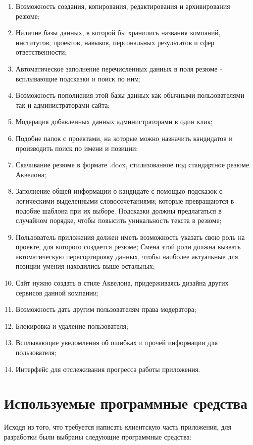 \documentclass[a4paper,12pt]{diplom}
\begin{document}
\begin{enumerate}
  \item Возможность создания, копирования, редактирования и архивирования резюме;
	\item Наличие базы данных, в которой бы хранились названия компаний, институтов,
	проектов, навыков, персональных результатов и сфер ответственности;
	\item Автоматическое заполнение перечисленных данных в поля резюме - всплывающие подсказки и поиск по ним;
	\item Возможность пополнения этой базы данных как обычными пользователями так и администраторами сайта;
	\item Модерация добавленных данных администраторами в один клик;
	\item Подобие папок с проектами, на которые можно назначить кандидатов и производить поиск по имени и позиции;
	\item Скачивание резюме в формате .docx, стилизованное под стандартное резюме Аквелона;
	\item Заполнение общей информации о кандидате с помощью подсказок с логическими выделенными словосочетаниями;
	 которые превращаются в подобие шаблона при их выборе. Подсказки должны предлагаться в случайном порядке, чтобы повысить уникальность текста в резюме;
	\item Пользователь приложения должен иметь возможность указать свою роль на проекте, для которого создается резюме;
	 Смена этой роли должна вызвать автоматическую пересортировку данных, 
	 чтобы наиболее актуальные для позиции умения находились выше остальных;
	 \item Сайт нужно создать в стиле Аквелона, придерживаясь дизайна других сервисов данной 
	 компании;
	 \item Возможность дать другим пользователям права модератора;
	 \item Блокировка и удаление пользователя;
	 \item Всплывающие уведомления об ошибках и прочей информации для пользователя;
	 \item Интерфейс для отслеживания прогресса работы приложения.
\end{enumerate}

\section{Используемые программные средства}

Исходя из того, что требуется написать клиентскую часть приложения, для разработки были выбраны следующие программные средства:
\end{document}
